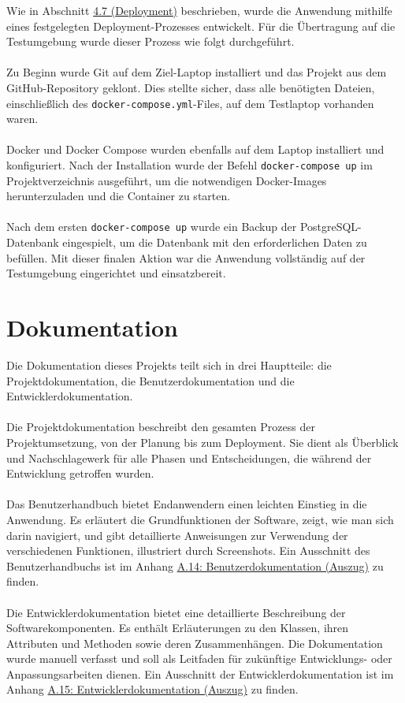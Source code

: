 \documentclass[a4paper,12pt]{article}
\begin{document}
Wie in Abschnitt \hyperref[sec:deployment]{4.7 (Deployment)} beschrieben, wurde die Anwendung mithilfe eines festgelegten Deployment-Prozesses entwickelt. Für die Übertragung auf die Testumgebung wurde dieser Prozess wie folgt durchgeführt.\\
\\
Zu Beginn wurde Git auf dem Ziel-Laptop installiert und das Projekt aus dem GitHub-Repository geklont. Dies stellte sicher, dass alle benötigten Dateien, einschließlich des \texttt{docker-compose.yml}-Files, auf dem Testlaptop vorhanden waren.\\
\\
Docker und Docker Compose wurden ebenfalls auf dem Laptop installiert und konfiguriert. Nach der Installation wurde der Befehl \texttt{docker-compose up} im Projektverzeichnis ausgeführt, um die notwendigen Docker-Images herunterzuladen und die Container zu starten.\\
\\
Nach dem ersten \texttt{docker-compose up} wurde ein Backup der PostgreSQL-Datenbank eingespielt, um die Datenbank mit den erforderlichen Daten zu befüllen. Mit dieser finalen Aktion war die Anwendung vollständig auf der Testumgebung eingerichtet und einsatzbereit.


\section{Dokumentation}
Die Dokumentation dieses Projekts teilt sich in drei Hauptteile: die Projektdokumentation, die Benutzerdokumentation und die Entwicklerdokumentation.\\
\\
Die Projektdokumentation beschreibt den gesamten Prozess der Projektumsetzung, von der Planung bis zum Deployment. Sie dient als Überblick und Nachschlagewerk für alle Phasen und Entscheidungen, die während der Entwicklung getroffen wurden.\\
\\
Das Benutzerhandbuch bietet Endanwendern einen leichten Einstieg in die Anwendung. Es erläutert die Grundfunktionen der Software, zeigt, wie man sich darin navigiert, und gibt detaillierte Anweisungen zur Verwendung der verschiedenen Funktionen, illustriert durch Screenshots. Ein Ausschnitt des Benutzerhandbuchs ist im Anhang \hyperref[sec:benutzerdokumentation]{A.14: Benutzerdokumentation (Auszug)} zu finden.\\
\\
Die Entwicklerdokumentation bietet eine detaillierte Beschreibung der Softwarekomponenten. Es enthält Erläuterungen zu den Klassen, ihren Attributen und Methoden sowie deren Zusammenhängen. Die Dokumentation wurde manuell verfasst und soll als Leitfaden für zukünftige Entwicklungs- oder Anpassungsarbeiten dienen. Ein Ausschnitt der Entwicklerdokumentation ist im Anhang \hyperref[sec:entwicklerdokumentation]{A.15: Entwicklerdokumentation (Auszug)} zu finden.
\end{document}
